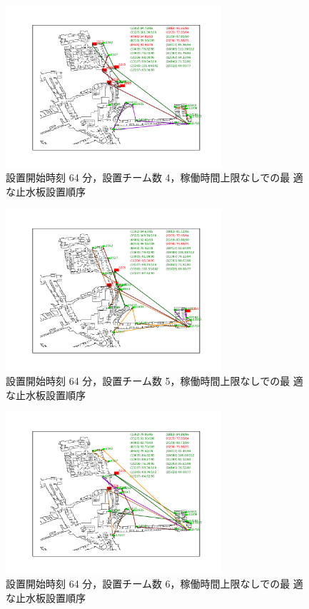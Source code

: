 \documentclass[a4paper,12pt,fleqn]{jarticle}
\begin{document}
\begin{figure}[htpb]
 \begin{center}
  \includegraphics[width=8cm,trim=100 50 100 50]{fig/64min_4team_nolim.pdf}
  \caption{設置開始時刻 64 分，設置チーム数 4，稼働時間上限なしでの最
  適な止水板設置順序}
  \label{fig:64min_4team_nolim_}
 \end{center}
\end{figure}

\begin{figure}[htpb]
 \begin{center}
  \includegraphics[width=8cm,trim=100 50 100 50]{fig/64min_5team_nolim.pdf}
  \caption{設置開始時刻 64 分，設置チーム数 5，稼働時間上限なしでの最
  適な止水板設置順序}
  \label{fig:64min_5team_nolim_}
 \end{center}
\end{figure}

\begin{figure}[htpb]
 \begin{center}
  \includegraphics[width=8cm,trim=100 50 100 50]{fig/64min_6team_nolim.pdf}
  \caption{設置開始時刻 64 分，設置チーム数 6，稼働時間上限なしでの最
  適な止水板設置順序}
  \label{fig:64min_6team_nolim_}
 \end{center}
\end{figure}
\end{document}
